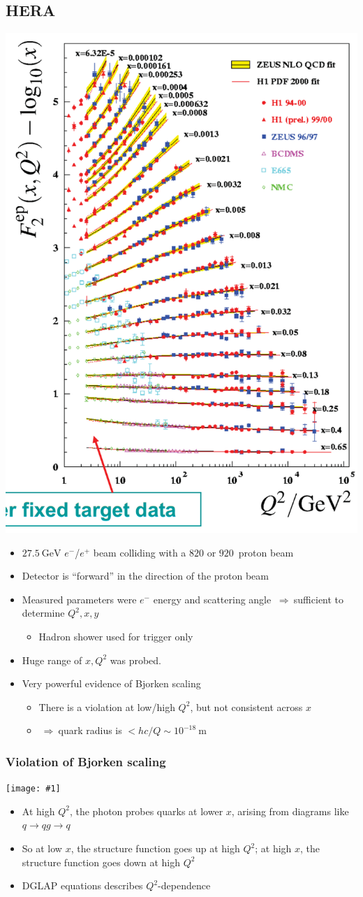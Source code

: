 \documentclass[11pt]{article}
\newcommand{\gev}{\text{GeV}}
\newcommand{\m}{\text{m}}
\newcommand{\el}{\ensuremath{e^{-}}\xspace}
\newcommand{\pos}{\ensuremath{e^{+}}\xspace}
\newcommand{\thus}{\ensuremath{~\Rightarrow~}}
\newcommand{\embedimgw}[2]{\begin{center}\texttt{[image: \#1]}\end{center}}
\begin{document}
\subsection{HERA}
  \begin{center}  \includegraphics[height=0.7\textwidth,angle=90]{figs/hera.png} \end{center}
\begin{itemize}
  \item $27.5~\gev$ \el/\pos beam colliding with a $820$ or $920$~\gev proton beam
  \item Detector is ``forward'' in the direction of the proton beam
  \item Measured parameters were \el energy and scattering angle \thus sufficient to determine $Q^2,x,y$
  \begin{itemize}
    \item Hadron shower used for trigger only
  \end{itemize}
  \item Huge range of $x,Q^2$ was probed. 
  \item Very powerful evidence of Bjorken scaling 
  \begin{itemize}
    \item There is a violation at low/high $Q^2$, but not consistent across $x$ 
    \item \thus quark radius is $< hc/Q \sim 10^{-18}~\m$
  \end{itemize}
\end{itemize}

\subsubsection{Violation of Bjorken scaling}
\embedimgw{figs/scaleviol.png}{.7}
\begin{itemize}
  \item At high $Q^2$, the photon probes quarks at lower $x$, arising from diagrams like $q\rightarrow qg\rightarrow q$
  \item So at low $x$, the structure function goes up at high $Q^2$; at high $x$, the structure function goes down at high $Q^2$
  \item DGLAP equations describes $Q^2$-dependence
\end{itemize}
\end{document}
